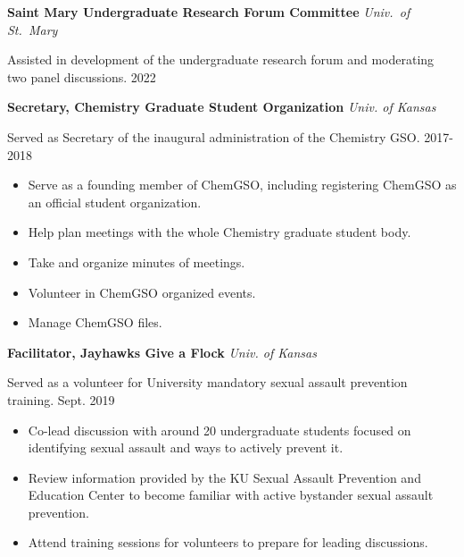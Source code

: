 {\bf Saint Mary Undergraduate Research Forum Committee} \hfill \textit{Univ.\ of St.\ Mary}

Assisted in development of the undergraduate research forum and moderating two panel discussions. \hfill 2022  


\vspace{\y}
{\bf Secretary, Chemistry Graduate Student Organization} \hfill \textit{Univ. of Kansas}

Served as Secretary of the inaugural administration of the Chemistry GSO. \hfill 2017-2018

\begin{itemize}[rightmargin=\dimexpr\linewidth-10cm-\leftmargin\relax,noitemsep,topsep=0cm]
\raggedright
    \item Serve as a founding member of ChemGSO, including registering ChemGSO as an official student organization.
    \item Help plan meetings with the whole Chemistry graduate student body.
    \item Take and organize minutes of meetings.
    \item Volunteer in ChemGSO organized events.
    \item Manage ChemGSO files.
\end{itemize}


\vspace{\y}
{\bf Facilitator, Jayhawks Give a Flock} \hfill \textit{Univ. of Kansas}

Served as a volunteer for University mandatory sexual assault prevention training. \hfill Sept. 2019

\begin{itemize}[rightmargin=\dimexpr\linewidth-10cm-\leftmargin\relax,noitemsep,topsep=0cm]
\raggedright
  \item Co-lead discussion with around 20 undergraduate students focused on identifying sexual assault and ways to actively prevent it.
  \item Review information provided by the KU Sexual Assault Prevention and Education Center to become familiar with active bystander sexual assault prevention.
  \item Attend training sessions for volunteers to prepare for leading discussions.
\end{itemize}
